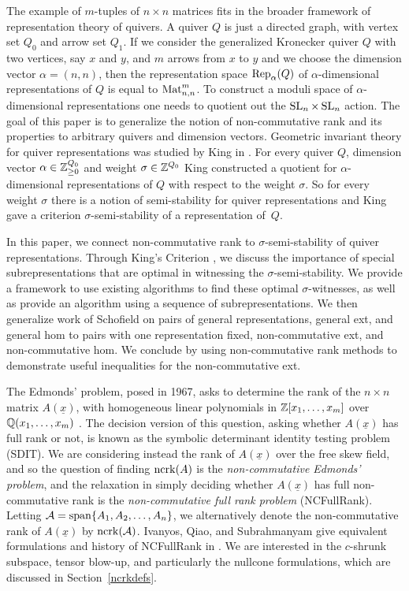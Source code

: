 \documentclass[12pt]{amsart}
\begin{document}
The example of $m$-tuples of $n\times n$ matrices fits in the broader framework of representation theory of quivers. A quiver $Q$ is just a directed graph,
with vertex set $Q_0$ and arrow set $Q_1$.
If we consider the generalized Kronecker quiver $Q$ with two vertices, say $x$ and $y$, and $m$ arrows from $x$ to $y$
and we choose the dimension vector $\alpha=(n,n)$, then the representation space $\operatorname{Rep}_\alpha(Q)$ of $\alpha$-dimensional representations of $Q$ is equal to $\operatorname{Mat}_{n,n}^m$. To construct a moduli space of $\alpha$-dimensional representations one needs to quotient out the $\operatorname{SL}_n\times \operatorname{SL}_n$ action. The goal of this paper is to generalize the notion of non-commutative rank and its properties to arbitrary quivers and dimension vectors. Geometric invariant theory for quiver representations was studied by King in \cite{King94}. For every quiver $Q$, dimension vector $\alpha\in {\mathbb Z}_{\geq 0}^{Q_0}$ and weight $\sigma\in {\mathbb Z}^{Q_0}$
King constructed a quotient for $\alpha$-dimensional representations of $Q$ with respect to the weight $\sigma$.
So for every weight $\sigma$ there is a notion of semi-stability for quiver representations and King gave a criterion  $\sigma$-semi-stability of a representation of~$Q$. 

In this paper, we connect non-commutative rank to $\sigma$-semi-stability of quiver representations. Through King's Criterion \cite{King94}, we discuss the importance of special subrepresentations that are optimal in witnessing the $\sigma$-semi-stability. We provide a framework to use existing algorithms to find these optimal $\sigma$-witnesses, as well as provide an algorithm using a sequence of subrepresentations. We then generalize work of Schofield on pairs of general representations, general ext, and general hom to pairs with one representation fixed, non-commutative ext, and non-commutative hom. We conclude by using non-commutative rank methods to demonstrate useful inequalities for the non-commutative ext. 

The Edmonds' problem, posed in 1967, asks to determine the rank of the $n\times n$ matrix $A(\underline{x})$, with homogeneous linear polynomials in ${\mathbb Z}[x_1,\ldots,x_m]$ over ${\mathbb Q}(x_1,\ldots,x_m)$ \cite{Edm67}. The decision version of this question, asking whether $A(\underline{x})$ has full rank or not, is known as the symbolic determinant identity testing problem (SDIT). We are considering instead the rank of $A(\underline{x})$ over the free skew field, and so the question of finding $\operatorname{ncrk}(A)$ is the \emph{non-commutative Edmonds' problem}, and the relaxation in simply deciding whether $A(\underline{x})$ has full non-commutative rank is the \emph{non-commutative full rank problem} (NCFullRank). Letting $\mathcal{A}=\operatorname{span}\{A_1,A_2,\ldots,A_n\}$, we alternatively denote the non-commutative rank of $A(\underline{x})$ by $\operatorname{ncrk}(\mathcal{A})$. Ivanyos, Qiao, and Subrahmanyam give equivalent formulations and history of NCFullRank in \cite{IQS17}. We are interested in the $c$-shrunk subspace, tensor blow-up, and particularly the nullcone formulations, which are discussed in Section~\ref{ncrkdefs}.
\end{document}
